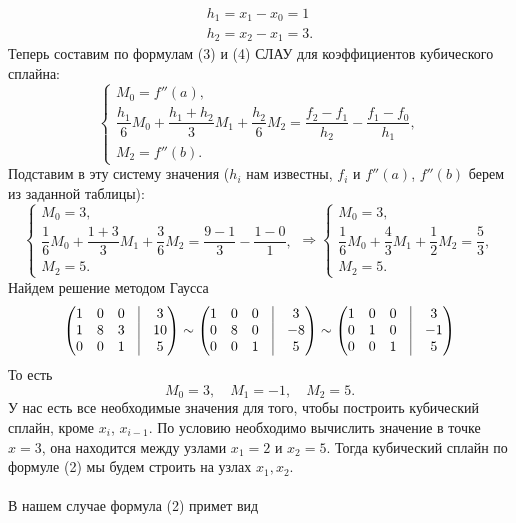 \documentclass[a4paper, 12pt]{article}
\begin{document}
\begin{enumerate}
$$\begin{matrix}
			h_1 = x_1 - x_0 = 1\\
			h_2 = x_2 - x_1 = 3.
		\end{matrix}$$
		Теперь составим по формулам (3) и (4) СЛАУ для коэффициентов кубического сплайна:
		$$\begin{cases}
			M_0 = f''(a),\\
			\dfrac{h_1}{6}M_{0} + \dfrac{h_1 + h_{2}}{3}M_1 + \dfrac{h_{2}}{6}M_{2} = \dfrac{f_{2} - f_1}{h_{2}} - \dfrac{f_1 - f_{0}}{h_1},\\
			M_2 = f''(b).
		\end{cases}$$
		Подставим в эту систему значения ($h_i$ нам известны, $f_i$ и $f''(a)$, $f''(b)$ берем из заданной таблицы):
		$$\begin{cases}
			M_0 = 3,\\
			\dfrac{1}{6}M_{0} + \dfrac{1+3}{3}M_1 + \dfrac{3}{6}M_{2} = \dfrac{9 -1}{3} - \dfrac{1 - 0}{1},\\
			M_2=5.
		\end{cases}
		\Rightarrow 
		\begin{cases}
			M_0 = 3,\\
			\dfrac{1}{6}M_{0} + \dfrac43M_1 + \dfrac{1}{2}M_{2} = \dfrac53,\\
			M_{2}=5.
		\end{cases}$$
		Найдем решение методом Гаусса 
		$$\begin{pmatrix}
			1&0&0&\vline&3\\
			1&8&3&\vline&10\\
			0&0&1&\vline&5
		\end{pmatrix}
		\sim 
		\begin{pmatrix}
			1&0&0&\vline&3\\
			0&8&0&\vline&-8\\
			0&0&1&\vline&5
		\end{pmatrix}
		\sim
		\begin{pmatrix}
			1&0&0&\vline&3\\
			0&1&0&\vline&-1\\
			0&0&1&\vline&5
		\end{pmatrix}$$
		То есть $$M_0 = 3,\quad M_1 = -1,\quad M_2 = 5.$$
		У нас есть все необходимые значения для того, чтобы построить кубический сплайн, кроме $x_i$, $x_{i-1}$. По условию необходимо вычислить значение в точке $x=3$, она находится между узлами $x_1 = 2$ и $x_2 = 5$. Тогда кубический сплайн по формуле (2) мы будем строить на узлах $x_1, x_2$.\\\\
		В нашем случае формула (2) примет вид \begin{multline*}

\end{multline*}
\end{enumerate}
\end{document}
